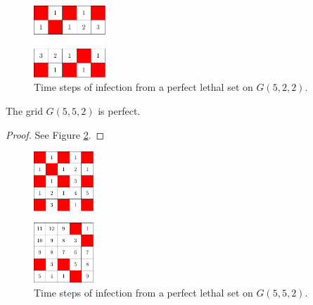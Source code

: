 \begin{figure}[H]
\centering
\includegraphics[width=0.24\textwidth]{figures/7/2x5x2_numbered_heatmap.pdf}
\caption{Time steps of infection from a perfect lethal set on $G(5,2,2)$.}
\label{fig:2x5x2_numbered_heatmap}
\end{figure} 

\newpage

\begin{con}
\label{con:5x5x2}
The grid $G(5,5,2)$ is perfect.
\end{con}

\begin{proof}
See Figure \ref{fig:5x5x2_numbered_heatmap}.
\end{proof}

\begin{figure}[H]
\centering
\includegraphics[width=0.2\textwidth]{figures/A/5x5x2_numbered_heatmap.pdf}
\caption{Time steps of infection from a perfect lethal set on $G(5,5,2)$.}
\label{fig:5x5x2_numbered_heatmap}
\end{figure}




